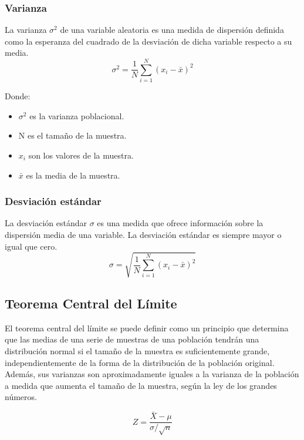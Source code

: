 \documentclass{article}
\begin{document}
    \subsubsection{Varianza}
    \par La varianza \( \sigma^2 \) de una variable aleatoria es una medida de dispersión definida como la esperanza del cuadrado de la desviación de dicha variable respecto a su media.
        \begin{equation}
            \sigma^2 = \frac{1}{N} \sum_{i=1}^{N} (x_i - \bar{x})^2
        \end{equation}
    \par Donde:
        \begin{itemize}
            \item \( \sigma^2 \) es la varianza poblacional.
            \item N es el tamaño de la muestra.
            \item \(x_i\) son los valores de la muestra.
            \item \(\bar{x}\) es la media de la muestra. 
        \end{itemize}
    \subsubsection{Desviación estándar}
    \par La desviación estándar \( \sigma\) es una medida que ofrece información sobre la dispersión media de una variable. La desviación estándar es siempre mayor o igual que cero.
        \begin{equation}
            \sigma = \sqrt{\frac{1}{N} \sum_{i=1}^{N} (x_i - \bar{x})^2}
        \end{equation}

\subsection{Teorema Central del Límite}
\par El teorema central del límite se puede definir como un principio que determina que las medias de una serie de muestras de una población tendrán una distribución normal si el tamaño de la muestra es suficientemente grande, independientemente de la forma de la distribución de la población original. Además, sus varianzas son aproximadamente iguales a la varianza de la población a medida que aumenta el tamaño de la muestra, según la ley de los grandes números. 

\begin{equation}
Z = \frac{\bar{X} - \mu}{\sigma / \sqrt{n}}
\end{equation}
\end{document}
